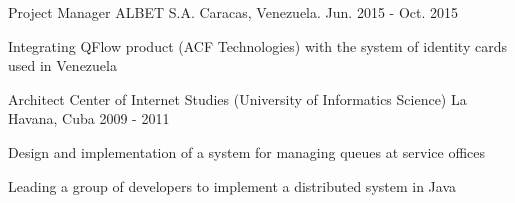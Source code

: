 \begin{cventries}

\cventry
{Project Manager} %
{ALBET S.A.} %
{Caracas, Venezuela.} %
{Jun. 2015 - Oct. 2015} %
{ %
\begin{cvitems}
\item {Integrating QFlow product (ACF Technologies) with the system of identity cards used in Venezuela}
\end{cvitems}
}


\cventry
{Architect} %
{Center of Internet Studies (University of Informatics Science)} %
{La Havana, Cuba} %
{2009 - 2011} %
{ %
\begin{cvitems}
\item {Design and implementation of a system for managing queues at service offices}
\item {Leading a group of developers to implement a distributed system in Java}
\end{cvitems}
}


\end{cventries}
